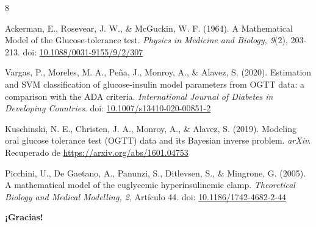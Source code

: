 \documentclass{beamer}
\begin{document}
    \begin{frame}
		\begin{thebibliography}{8}
        
            Ackerman, E., Rosevear, J. W., \& McGuckin, W. F. (1964). A Mathematical Model of the Glucose-tolerance test. \textit{Physics in Medicine and Biology, 9}(2), 203-213. doi: \href{https://doi.org/10.1088/0031-9155/9/2/307}{10.1088/0031-9155/9/2/307}

            Vargas, P., Moreles, M. A., Peña, J., Monroy, A., \& Alavez, S. (2020). Estimation and SVM classification of glucose-insulin model parameters from OGTT data: a comparison with the ADA criteria. \textit{International Journal of Diabetes in Developing Countries}. doi: \href{https://doi.org/10.1007/s13410-020-00851-2}{10.1007/s13410-020-00851-2}

            Kuschinski, N. E., Christen, J. A., Monroy, A., \& Alavez, S. (2019). Modeling oral glucose tolerance test (OGTT) data and its Bayesian inverse problem. \textit{arXiv}. Recuperado de \href{https://arxiv.org/abs/1601.04753}{https://arxiv.org/abs/1601.04753}

            Picchini, U., De Gaetano, A., Panunzi, S., Ditlevsen, S., \& Mingrone, G. (2005). A mathematical model of the euglycemic hyperinsulinemic clamp. \textit{Theoretical Biology and Medical Modelling, 2}, Art\'{i}culo 44. doi: \href{https://doi.org/10.1186/1742-4682-2-44}{10.1186/1742-4682-2-44}

        \end{thebibliography}
	\end{frame}



    \begin{frame}[plain, c] 
        \centering
        \fontsize{40}{70}\selectfont \textbf{\textcolor{structure}{¡Gracias!}} 
    \end{frame}
    
\end{document}
